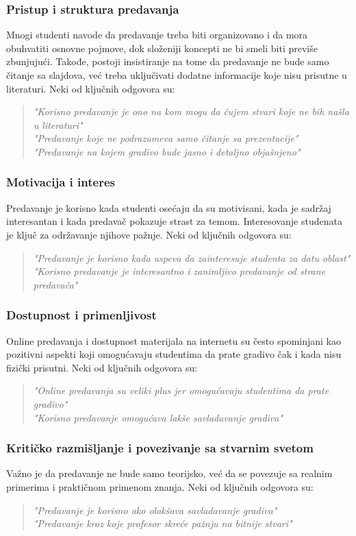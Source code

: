 \documentclass{article}
\begin{document}
\subsubsection{Pristup i struktura predavanja}
Mnogi studenti navode da predavanje treba biti organizovano i da mora obuhvatiti osnovne pojmove, dok složeniji koncepti ne bi smeli biti previše zbunjujući. Takođe, postoji insistiranje na tome da predavanje ne bude samo čitanje sa slajdova, već treba uključivati dodatne informacije koje nisu prisutne u literaturi. Neki od ključnih odgovora su:
\begin{quote}
    \textit{"Korisno predavanje je ono na kom mogu da čujem stvari koje ne bih našla u literaturi"} \\
    \textit{"Predavanje koje ne podrazumeva samo čitanje sa prezentacije"} \\
    \textit{"Predavanje na kojem gradivo bude jasno i detaljno objašnjeno"}
\end{quote}

\subsubsection{Motivacija i interes}
Predavanje je korisno kada studenti osećaju da su motivisani, kada je sadržaj interesantan i kada predavač pokazuje strast za temom. Interesovanje studenata je ključ za održavanje njihove pažnje. Neki od ključnih odgovora su:
\begin{quote}
    \textit{"Predavanje je korisno kada uspeva da zainteresuje studenta za datu oblast"} \\
    \textit{"Korisno predavanje je interesantno i zanimljivo predavanje od strane predavača"}
\end{quote}

\subsubsection{Dostupnost i primenljivost}
Online predavanja i dostupnost materijala na internetu su često spominjani kao pozitivni aspekti koji omogućavaju studentima da prate gradivo čak i kada nisu fizički prisutni. Neki od ključnih odgovora su:
\begin{quote}
    \textit{"Online predavanja su veliki plus jer omogućavaju studentima da prate gradivo"} \\
    \textit{"Korisno predavanje omogućava lakše savladavanje gradiva"}
\end{quote}

\subsubsection{Kritičko razmišljanje i povezivanje sa stvarnim svetom}
Važno je da predavanje ne bude samo teorijsko, već da se povezuje sa realnim primerima i praktičnom primenom znanja. Neki od ključnih odgovora su:
\begin{quote}
    \textit{"Predavanje je korisno ako olakšava savladavanje gradiva"} \\
    \textit{"Predavanje kroz koje profesor skreće pažnju na bitnije stvari"}
\end{quote}
\end{document}

